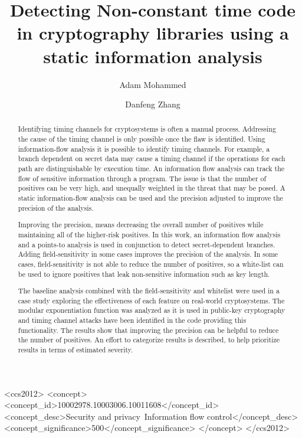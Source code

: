\documentclass[sigconf, authorversion]{acmart}
\begin{document}
\title{Detecting Non-constant time code in cryptography libraries using a static
  information analysis} 

\author{Adam Mohammed}

\author{Danfeng Zhang}


\begin{abstract}
Identifying timing channels for cryptosystems is often a manual process.
Addressing the cause of the timing channel is only possible once the flaw is
identified. Using information-flow analysis it is possible to identify timing
channels. For example, a branch dependent on secret data may cause a timing
channel if the operations for each path are distinguishable by execution time.
An information flow analysis can track the flow of sensitive information
through a program. The issue is that the number of positives can be very high,
and unequally weighted in the threat that may be posed. A static
information-flow analysis can be used and the precision adjusted to improve
the precision of the analysis.

Improving the precision, means decreasing the overall number of positives while
maintaining all of the higher-risk positives. In this work, an
information flow analysis and a points-to analysis is used in conjunction to
detect secret-dependent branches. Adding field-sensitivity in some cases
improves the precision of the analysis. In some cases, field-sensitivity is not
able to reduce the number of positives, so a white-list can be used to ignore
positives that leak non-sensitive information such as key length.

The baseline analysis combined with the field-sensitivity and whitelist were
used in a case study exploring the effectiveness of each feature on real-world
cryptosystems. The modular exponentiation function was analyzed as it is used
in public-key cryptography and timing channel attacks have been identified in the
code providing this functionality. The results show that improving the precision
can be helpful to reduce the number of positives. An effort to categorize
results is described, to help prioritize results in terms of estimated severity.
\end{abstract}


%
%
 \begin{CCSXML}
<ccs2012>
<concept>
<concept_id>10002978.10003006.10011608</concept_id>
<concept_desc>Security and privacy~Information flow control</concept_desc>
<concept_significance>500</concept_significance>
</concept>
</ccs2012>
\end{CCSXML}
\end{document}
